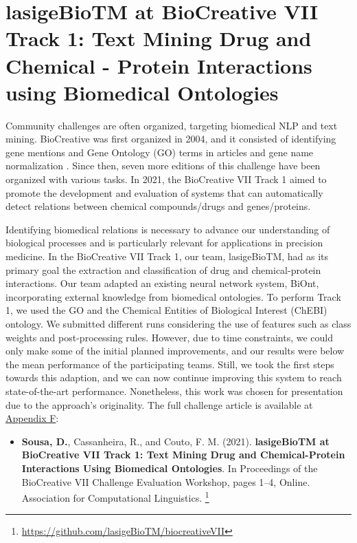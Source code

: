 \section{lasigeBioTM at BioCreative VII Track 1: Text Mining Drug and Chemical - Protein Interactions using Biomedical Ontologies}

Community challenges are often organized, targeting biomedical NLP and text mining.
BioCreative was first organized in 2004, and it consisted of identifying gene mentions and Gene Ontology (GO) terms in articles and gene name normalization \citep{hirschman2005overview}. Since then, seven more editions of this challenge have been organized with various tasks. In 2021, the BioCreative VII Track 1 aimed to promote the development and evaluation of systems that can automatically detect relations between chemical compounds/drugs and genes/proteins.

Identifying biomedical relations is necessary to advance our understanding of biological processes and is particularly relevant for applications in precision medicine. In the BioCreative VII Track 1, our team, lasigeBioTM, had as its primary goal the extraction and classification of drug and chemical-protein interactions. Our team adapted an existing neural network system, BiOnt, incorporating external knowledge from biomedical ontologies. To perform Track 1, we used the GO and the Chemical Entities of Biological Interest (ChEBI) ontology. We submitted different runs considering the use of features such as class weights and post-processing rules. However, due to time constraints, we could only make some of the initial planned improvements, and our results were below the mean performance of the participating teams. Still, we took the first steps towards this adaption, and we can now continue improving this system to reach state-of-the-art performance. Nonetheless, this work was chosen for presentation due to the approach's originality. The full challenge article is available at \hyperlink{AF}{Appendix F}:

\begin{itemize}[label=]
    \item{\textbf{Sousa, D.}, Cassanheira, R., and Couto, F. M. (2021). \textbf{lasigeBioTM at BioCreative VII Track 1: Text Mining Drug and Chemical-Protein Interactions Using Biomedical Ontologies}. In Proceedings of the BioCreative VII Challenge Evaluation Workshop, pages 1–4, Online. Association for Computational Linguistics. \citep{sousalasigebiotm}} \footnote{\url{https://github.com/lasigeBioTM/biocreativeVII}}
\end{itemize}


